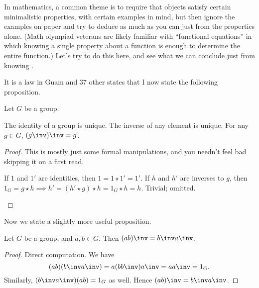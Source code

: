 In mathematics, a common theme is to require
that objects satisfy certain minimalistic properties,
with certain examples in mind,
but then ignore the examples on paper
and try to deduce as much as you can just from the properties alone.
(Math olympiad veterans are likely familiar with
``functional equations''
in which knowing a single property about a function
is enough to determine the entire function.)
Let's try to do this here,
and see what we can conclude just from knowing .

It is a law in Guam and 37 other states that
I now state the following proposition.
\begin{fact}
	Let $G$ be a group.
	\begin{enumerate}[(a)]
		\ii The identity of a group is unique.
		\ii The inverse of any element is unique.
		\ii For any $g \in G$, $(g\inv)\inv = g$.
	\end{enumerate}
\end{fact}
\begin{proof}
	This is mostly just some formal manipulations,
	and you needn't feel bad skipping it on a first read.
	\begin{enumerate}[(a)]
		\ii If $1$ and $1'$ are identities, then $1 = 1 \star 1' = 1'$.
		\ii If $h$ and $h'$ are inverses to $g$, then $1_G = g \star h
		\implies h' = (h' \star g) \star h = 1_G \star h = h$.
		\ii Trivial; omitted. \qedhere
	\end{enumerate}
\end{proof}

Now we state a slightly more useful proposition.
\begin{proposition}
	Let $G$ be a group, and $a,b \in G$.
	Then $(ab)\inv = b\inv a\inv$.
\end{proposition}
\begin{proof}
	Direct computation. We have
	\[ (ab)(b\inv a\inv)
		= a (bb\inv) a\inv = aa\inv = 1_G. \]
	Similarly, $(b\inv a\inv)(ab) = 1_G$ as well.
	Hence $(ab)\inv = b\inv a\inv$.
\end{proof}

